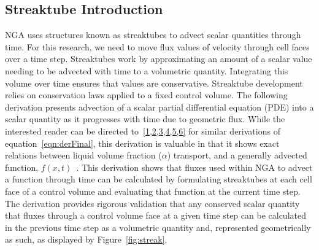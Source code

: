 \subsection{Streaktube Introduction}
NGA uses structures known as streaktubes to advect scalar quantities through time. For this research, we need to move flux values of velocity through cell faces over a time step. Streaktubes work by approximating an amount of a scalar value needing to be advected with time to a volumetric quantity. Integrating this volume over time ensures that values are conservative. Streaktube development relies on conservation laws applied to a fixed control volume. The following derivation presents advection of a scalar partial differential equation (PDE) into a scalar quantity as it progresses with time due to geometric flux. While the interested reader can be directed to~\ref{1,2,3,4,5,6}  for similar derivations of equation~\ref{eqn:derFinal}, this derivation is valuable in that it shows exact relations between liquid volume fraction ($\alpha$) transport, and a generally advected function, $f(x,t)$~\cite{Owkes2017}. This derivation shows that fluxes used within NGA to advect a function through time can be calculated by formulating streaktubes at each cell face of a control volume and evaluating that function at the current time step. The derivation provides rigorous validation that any conserved scalar quantity that fluxes through a control volume face at a given time step can be calculated in the previous time step as a volumetric quantity and, represented geometrically as such, as displayed by Figure~\ref{fig:streak}.  
